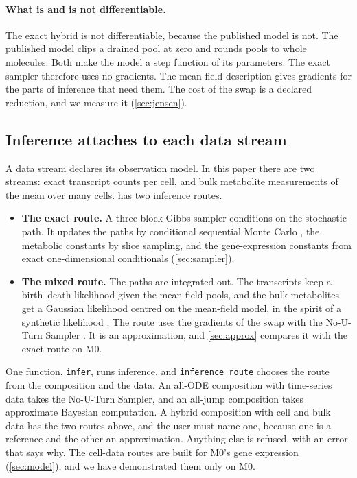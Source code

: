 \paragraph{What is and is not differentiable.} The exact hybrid is not
differentiable, because the published model is not. The published model clips a
drained pool at zero and rounds pools to whole molecules. Both make the model a step
function of its parameters. The exact sampler therefore uses no gradients. The
mean-field description gives gradients for the parts of inference that need them.
The cost of the swap is a declared reduction, and we measure it
(\cref{sec:jensen}).

\subsection{Inference attaches to each data stream}
\label{sec:api}

A data stream declares its observation model. In this paper there are two streams:
exact transcript counts per cell, and bulk metabolite measurements of the mean over
many cells. \IC{} has two inference routes.

\begin{itemize}
  \item \textbf{The exact route.} A three-block Gibbs sampler conditions on the
  stochastic path. It updates the paths by conditional sequential Monte Carlo
  \cite{andrieu2010particle}, the metabolic constants by slice sampling, and the
  gene-expression constants from exact one-dimensional conditionals
  (\cref{sec:sampler}).
  \item \textbf{The mixed route.} The paths are integrated out. The transcripts keep a birth--death likelihood given the mean-field pools, and the bulk metabolites get a Gaussian likelihood centred on the mean-field model, in the spirit of a synthetic likelihood \cite{wood2010statistical,price2018bayesian}. The route uses the gradients of the swap with the No-U-Turn
  Sampler \cite{hoffman2014nouturn}. It is an approximation, and
  \cref{sec:approx} compares it with the exact route on M0.
\end{itemize}

One function, \texttt{infer}, runs inference, and \texttt{inference\_route} chooses
the route from the composition and the data. An all-ODE composition with
time-series data takes the No-U-Turn Sampler, and an all-jump composition takes
approximate Bayesian computation. A hybrid composition with cell and bulk data has
the two routes above, and the user must name one, because one is a reference and the
other an approximation. Anything else is refused, with an error that says why. The
cell-data routes are built for M0's gene expression (\cref{sec:model}), and we have
demonstrated them only on M0.
